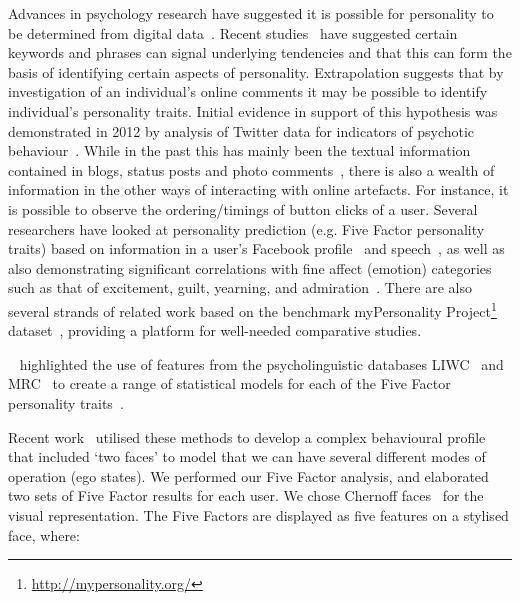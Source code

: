 \documentclass[letterpaper]{article}
\begin{document}
Advances in psychology research have suggested it is possible for
personality to be determined from digital
data~\cite{pennebaker+king:1999,vazire+gosling:2004,iacobelli-et-al:2011}.
Recent studies~\cite{woodworth-et-al:2012} have suggested certain
keywords and phrases can signal underlying tendencies and that this
can form the basis of identifying certain aspects of personality.
Extrapolation suggests that by investigation of an individual's online
comments it may be possible to identify individual's personality
traits. Initial evidence in support of this hypothesis was
demonstrated in 2012 by analysis of Twitter data for indicators of
psychotic behaviour~\cite{sumner-et-al:2012}. While in the past this
has mainly been the textual information contained in blogs, status
posts and photo comments~\cite{blamey-et-al-2012,blamey-et-al-2013},
there is also a wealth of information in the other ways of interacting
with online artefacts. For instance, it is possible to observe the
ordering/timings of button clicks of a user. Several researchers have
looked at personality prediction (e.g. Five Factor personality traits)
based on information in a user's Facebook
profile~\cite{back-et-al:2010,golbeck-et-al:2001} and
speech~\cite{chung+pennebaker:2007,tausczik+pennebaker:2010}, as well
as also demonstrating significant correlations with fine affect
(emotion) categories such as that of excitement, guilt, yearning, and
admiration~\cite{mohammad+kiritchenko:2013}. There are also several
strands of related work based on the benchmark myPersonality
Project\footnote{\url{http://mypersonality.org/}}
dataset~\cite{celli-et-al:2013}, providing a platform for well-needed
comparative studies.

\citeauthor{mairesse-et-al:2007}~
highlighted the use of features from the psycholinguistic databases
LIWC~\cite{pennebaker-et-al:2001} and MRC~\cite{wilson:1988} to create
a range of statistical models for each of the Five Factor personality
traits~\cite{norman:1963,peabody+goldberg:1989}.

Recent work~\cite{oatley+crick:2014} utilised these methods to develop
a complex behavioural profile that included `two faces' to model that
we can have several different modes of operation (ego states). We
performed our Five Factor analysis, and elaborated two sets of Five
Factor results for each user. We chose Chernoff
faces~\cite{chernoff:1973} for the visual representation. The Five
Factors are displayed as five features on a stylised face, where:
\end{document}
